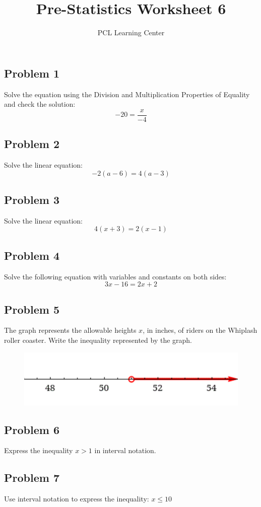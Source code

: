 \documentclass[12pt]{article}
\title{Pre-Statistics Worksheet 6}
\author{PCL Learning Center}
\date{}
\begin{document}
\maketitle

\subsection*{Problem 1}
Solve the equation using the Division and Multiplication Properties of Equality and check the solution:  
\[
-20 = \dfrac{x}{-4}
\]

\subsection*{Problem 2}
Solve the linear equation:  
\[
-2(a - 6) = 4(a - 3)
\]

\subsection*{Problem 3}
Solve the linear equation:  
\[
4(x + 3) = 2(x - 1)
\]

\subsection*{Problem 4}
Solve the following equation with variables and constants on both sides:  
\[
3x - 16 = 2x + 2
\]

\subsection*{Problem 5}
The graph represents the allowable heights \(x\), in inches, of riders on the Whiplash roller coaster.  
Write the inequality represented by the graph.

\begin{figure}[!ht]
    \centering
    \includegraphics[width=0.5\linewidth]{2.png}
\end{figure}

\subsection*{Problem 6}
Express the inequality \(x > 1\) in interval notation.

\subsection*{Problem 7}
Use interval notation to express the inequality:  
\(x \leq 10\)
\end{document}
